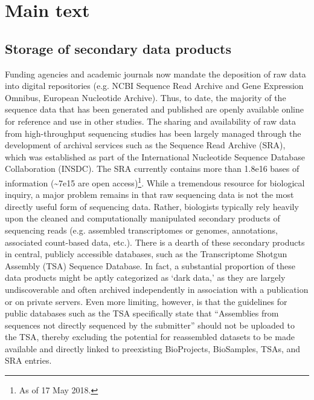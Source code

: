 \documentclass[12pt]{article}
\begin{document}
\section{Main text}
\subsection{Storage of secondary data products}
Funding agencies and academic journals now mandate the deposition of raw data into digital repositories (e.g. NCBI Sequence Read Archive and Gene Expression Omnibus, European Nucleotide Archive). Thus, to date, the majority of the sequence data that has been generated and published are openly available online for reference and use in other studies. The sharing and availability of raw data from high-throughput sequencing studies has been largely managed through the development of archival services such as the Sequence Read Archive (SRA), which was established as part of the International Nucleotide Sequence Database Collaboration (INSDC)\cite{Kodama2012, Shumway2009}. The SRA currently contains more than 1.8e16 bases of information (\textasciitilde7e15 are open access)\footnote{As of 17 May 2018.}. While a tremendous resource for biological inquiry, a major problem remains in that raw sequencing data is not the most directly useful form of sequencing data. Rather, biologists typically rely heavily upon the cleaned and computationally manipulated secondary products of sequencing reads (e.g. assembled transcriptomes or genomes, annotations, associated count-based data, etc.). There is a dearth of these secondary products in central, publicly accessible databases, such as the  Transcriptome Shotgun Assembly (TSA) Sequence Database.
In fact, a substantial proportion of these data products might be aptly categorized as `dark data,' as they are largely undiscoverable and often archived independently in association with a publication or on private servers. Even more limiting, however, is that the guidelines for public databases such as the TSA specifically state that ``Assemblies from sequences not directly sequenced by the submitter'' should not be uploaded to the TSA, thereby excluding the potential for reassembled datasets to be made available and directly linked to preexisting BioProjects, BioSamples, TSAs, and SRA entries.
\end{document}
